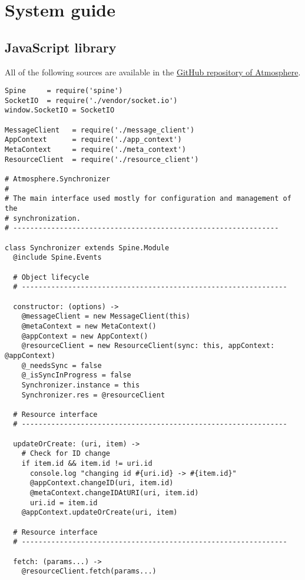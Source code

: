 \renewcommand{\thesection} {\Alph{section}}
\setcounter{section}{1}
\section{System guide}

\subsection{JavaScript library}

All of the following sources are available in the \href{https://github.com/vojto/atmos2}{GitHub repository of Atmosphere}.

\begin{lstlisting}[caption=synchronizer.coffee]
Spine     = require('spine')
SocketIO  = require('./vendor/socket.io')
window.SocketIO = SocketIO

MessageClient   = require('./message_client')
AppContext      = require('./app_context')
MetaContext     = require('./meta_context')
ResourceClient  = require('./resource_client')

# Atmosphere.Synchronizer
#
# The main interface used mostly for configuration and management of the
# synchronization.
# ---------------------------------------------------------------

class Synchronizer extends Spine.Module
  @include Spine.Events

  # Object lifecycle
  # ---------------------------------------------------------------

  constructor: (options) ->
    @messageClient = new MessageClient(this)
    @metaContext = new MetaContext()
    @appContext = new AppContext()
    @resourceClient = new ResourceClient(sync: this, appContext: @appContext)
    @_needsSync = false
    @_isSyncInProgress = false
    Synchronizer.instance = this
    Synchronizer.res = @resourceClient

  # Resource interface
  # ---------------------------------------------------------------

  updateOrCreate: (uri, item) ->
    # Check for ID change
    if item.id && item.id != uri.id
      console.log "changing id #{uri.id} -> #{item.id}"
      @appContext.changeID(uri, item.id)
      @metaContext.changeIDAtURI(uri, item.id)
      uri.id = item.id
    @appContext.updateOrCreate(uri, item)

  # Resource interface
  # ---------------------------------------------------------------

  fetch: (params...) ->
    @resourceClient.fetch(params...)
  

\end{lstlisting}
